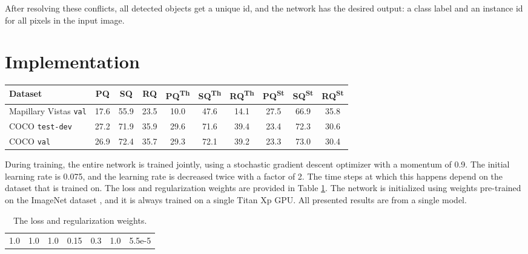 \documentclass[10pt,twocolumn,letterpaper]{article}
\begin{document}
After resolving these conflicts, all detected objects get a unique id, and the network has the desired output: a class label and an instance id for all pixels in the input image.




\section{Implementation}

\begin{table*}[ht]
\centering
\begin{tabular}{ l || c | c | c | c | c | c | c | c | c }
Dataset & PQ & SQ & RQ & PQ\textsuperscript{Th} & SQ\textsuperscript{Th} & RQ\textsuperscript{Th} & PQ\textsuperscript{St} & SQ\textsuperscript{St} & RQ\textsuperscript{St} \\
\hline
Mapillary Vistas \texttt{val} & 17.6 & 55.9 & 23.5 & 10.0 & 47.6 & 14.1 & 27.5 & 66.9 & 35.8 \\
COCO \texttt{test-dev} & 27.2 & 71.9 & 35.9 & 29.6 & 71.6 & 39.4 & 23.4 & 72.3 & 30.6 \\
COCO \texttt{val} & 26.9 & 72.4 & 35.7 & 29.3 & 72.1 & 39.2 & 23.3 & 73.0 & 30.4 \\
\end{tabular}
\caption{The best overall results on the COCO and Mapillary Vistas datasets. St = \textit{stuff} classes; Th = \textit{things} classes.}
\label{tab:overall_results}
\end{table*}


During training, the entire network is trained jointly, using a stochastic gradient descent optimizer with a momentum of 0.9. The initial learning rate is 0.075, and the learning rate is decreased twice with a factor of 2. The time steps at which this happens depend on the dataset that is trained on. The loss and regularization weights are provided in Table \ref{tab:loss_weights}. The network is initialized using weights pre-trained on the ImageNet dataset \cite{Deng2009}, and it is always trained on a single Titan Xp GPU. All presented results are from a single model. 


\begin{table}[H]
\centering
\begin{tabular}{ c | c | c | c | c | c | c}
 &  &  &  &  &  &  \\ \hline
1.0 & 1.0 & 1.0 & 0.15 & 0.3 & 1.0 & 5.5e-5 \\
\end{tabular}
\caption{The loss and regularization weights.}
\label{tab:loss_weights}
\end{table}
\end{document}

